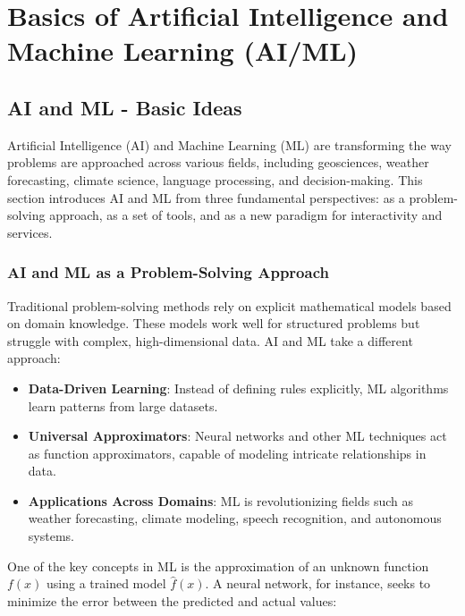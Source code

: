 \chapter{Basics of Artificial Intelligence and Machine Learning (AI/ML)}

%
\section{AI and ML - Basic Ideas}

Artificial Intelligence (AI) and Machine Learning (ML) are transforming the way problems are approached across various fields, including geosciences, weather forecasting, climate science, language processing, and decision-making. This section introduces AI and ML from three fundamental perspectives: as a problem-solving approach, as a set of tools, and as a new paradigm for interactivity and services.

\subsection{AI and ML as a Problem-Solving Approach}

Traditional problem-solving methods rely on explicit mathematical models based on domain knowledge. These models work well for structured problems but struggle with complex, high-dimensional data. AI and ML take a different approach:

\begin{itemize}
    \item \textbf{Data-Driven Learning}: Instead of defining rules explicitly, ML algorithms learn patterns from large datasets.
    \item \textbf{Universal Approximators}: Neural networks and other ML techniques act as function approximators, capable of modeling intricate relationships in data.
    \item \textbf{Applications Across Domains}: ML is revolutionizing fields such as weather forecasting, climate modeling, speech recognition, and autonomous systems.
\end{itemize}

One of the key concepts in ML is the approximation of an unknown function \( f(x) \) using a trained model \( \hat{f}(x) \). A neural network, for instance, seeks to minimize the error between the predicted and actual values:

